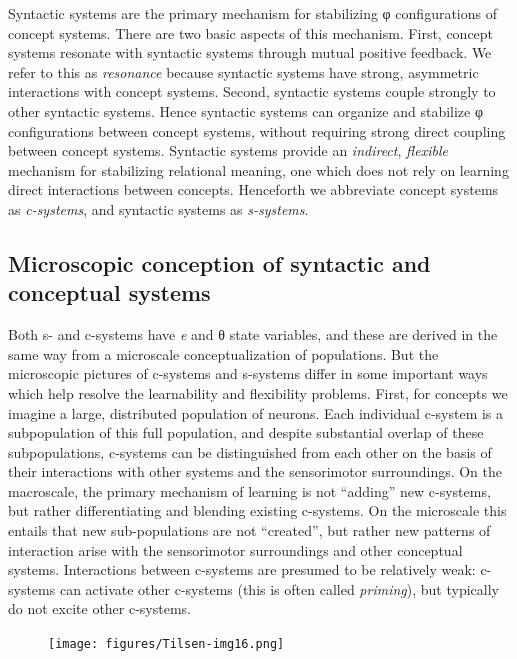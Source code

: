Syntactic systems are the primary mechanism for stabilizing φ configurations of concept systems. There are two basic aspects of this mechanism. First, concept systems resonate with syntactic systems through mutual positive feedback. We refer to this as \textit{resonance} because syntactic systems have strong, asymmetric interactions with concept systems. Second, syntactic systems couple strongly to other syntactic systems. Hence syntactic systems can organize and stabilize φ configurations between concept systems, without requiring strong direct coupling between concept systems. Syntactic systems provide an \textit{indirect}, \textit{flexible} mechanism for stabilizing relational meaning, one which does not rely on learning direct interactions between concepts. Henceforth we abbreviate concept systems as \textit{c-systems}, and syntactic systems as \textit{s-systems}. 

\subsection{Microscopic conception of syntactic and conceptual systems}

Both s- and c-systems have \textit{e} and θ state variables, and these are derived in the same way from a microscale conceptualization of populations. But the microscopic pictures of c-systems and s-systems differ in some important ways which help resolve the learnability and flexibility problems. First, for concepts we imagine a large, distributed population of neurons. Each individual c-system is a subpopulation of this full population, and despite substantial overlap of these subpopulations, c-systems can be distinguished from each other on the basis of their interactions with other systems and the sensorimotor surroundings. On the macroscale, the primary mechanism of learning is not “adding” new c-systems, but rather differentiating and blending existing c-systems. On the microscale this entails that new sub-populations are not “created”, but rather new patterns of interaction arise with the sensorimotor surroundings and other conceptual systems. Interactions between c-systems are presumed to be relatively weak: c-systems can activate other c-systems (this is often called \textit{priming}), but typically do not excite other c-systems.

  
\begin{figure}
\texttt{[image: figures/Tilsen-img16.png]}
\caption{\missingcaption}
\label{fig:}
\end{figure}
 

